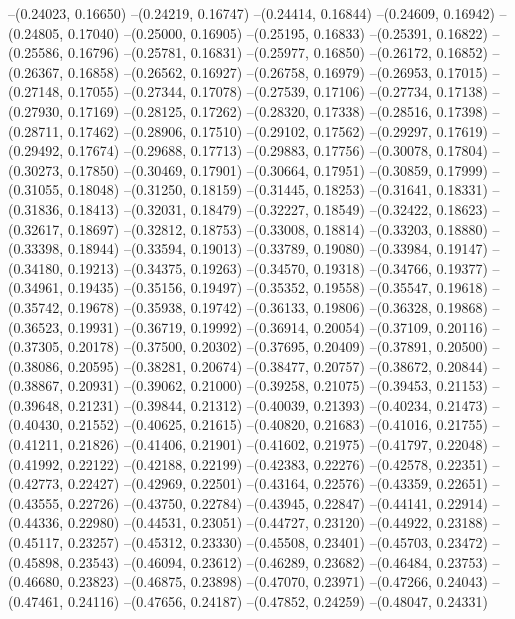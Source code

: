 --(0.24023, 0.16650)
--(0.24219, 0.16747)
--(0.24414, 0.16844)
--(0.24609, 0.16942)
--(0.24805, 0.17040)
--(0.25000, 0.16905)
--(0.25195, 0.16833)
--(0.25391, 0.16822)
--(0.25586, 0.16796)
--(0.25781, 0.16831)
--(0.25977, 0.16850)
--(0.26172, 0.16852)
--(0.26367, 0.16858)
--(0.26562, 0.16927)
--(0.26758, 0.16979)
--(0.26953, 0.17015)
--(0.27148, 0.17055)
--(0.27344, 0.17078)
--(0.27539, 0.17106)
--(0.27734, 0.17138)
--(0.27930, 0.17169)
--(0.28125, 0.17262)
--(0.28320, 0.17338)
--(0.28516, 0.17398)
--(0.28711, 0.17462)
--(0.28906, 0.17510)
--(0.29102, 0.17562)
--(0.29297, 0.17619)
--(0.29492, 0.17674)
--(0.29688, 0.17713)
--(0.29883, 0.17756)
--(0.30078, 0.17804)
--(0.30273, 0.17850)
--(0.30469, 0.17901)
--(0.30664, 0.17951)
--(0.30859, 0.17999)
--(0.31055, 0.18048)
--(0.31250, 0.18159)
--(0.31445, 0.18253)
--(0.31641, 0.18331)
--(0.31836, 0.18413)
--(0.32031, 0.18479)
--(0.32227, 0.18549)
--(0.32422, 0.18623)
--(0.32617, 0.18697)
--(0.32812, 0.18753)
--(0.33008, 0.18814)
--(0.33203, 0.18880)
--(0.33398, 0.18944)
--(0.33594, 0.19013)
--(0.33789, 0.19080)
--(0.33984, 0.19147)
--(0.34180, 0.19213)
--(0.34375, 0.19263)
--(0.34570, 0.19318)
--(0.34766, 0.19377)
--(0.34961, 0.19435)
--(0.35156, 0.19497)
--(0.35352, 0.19558)
--(0.35547, 0.19618)
--(0.35742, 0.19678)
--(0.35938, 0.19742)
--(0.36133, 0.19806)
--(0.36328, 0.19868)
--(0.36523, 0.19931)
--(0.36719, 0.19992)
--(0.36914, 0.20054)
--(0.37109, 0.20116)
--(0.37305, 0.20178)
--(0.37500, 0.20302)
--(0.37695, 0.20409)
--(0.37891, 0.20500)
--(0.38086, 0.20595)
--(0.38281, 0.20674)
--(0.38477, 0.20757)
--(0.38672, 0.20844)
--(0.38867, 0.20931)
--(0.39062, 0.21000)
--(0.39258, 0.21075)
--(0.39453, 0.21153)
--(0.39648, 0.21231)
--(0.39844, 0.21312)
--(0.40039, 0.21393)
--(0.40234, 0.21473)
--(0.40430, 0.21552)
--(0.40625, 0.21615)
--(0.40820, 0.21683)
--(0.41016, 0.21755)
--(0.41211, 0.21826)
--(0.41406, 0.21901)
--(0.41602, 0.21975)
--(0.41797, 0.22048)
--(0.41992, 0.22122)
--(0.42188, 0.22199)
--(0.42383, 0.22276)
--(0.42578, 0.22351)
--(0.42773, 0.22427)
--(0.42969, 0.22501)
--(0.43164, 0.22576)
--(0.43359, 0.22651)
--(0.43555, 0.22726)
--(0.43750, 0.22784)
--(0.43945, 0.22847)
--(0.44141, 0.22914)
--(0.44336, 0.22980)
--(0.44531, 0.23051)
--(0.44727, 0.23120)
--(0.44922, 0.23188)
--(0.45117, 0.23257)
--(0.45312, 0.23330)
--(0.45508, 0.23401)
--(0.45703, 0.23472)
--(0.45898, 0.23543)
--(0.46094, 0.23612)
--(0.46289, 0.23682)
--(0.46484, 0.23753)
--(0.46680, 0.23823)
--(0.46875, 0.23898)
--(0.47070, 0.23971)
--(0.47266, 0.24043)
--(0.47461, 0.24116)
--(0.47656, 0.24187)
--(0.47852, 0.24259)
--(0.48047, 0.24331)
